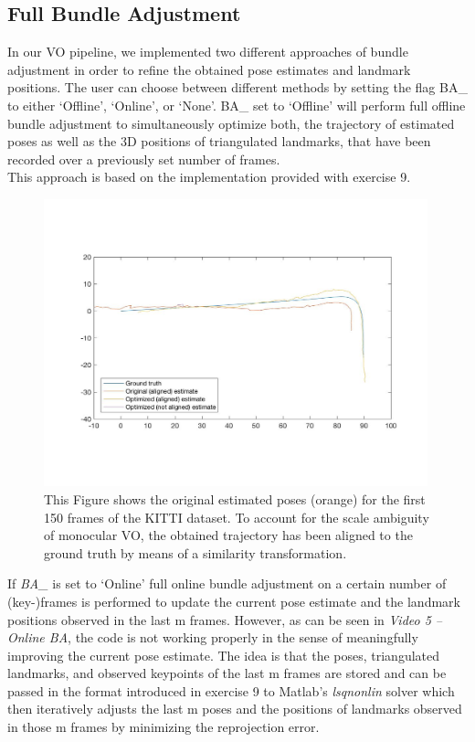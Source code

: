 \subsection{Full Bundle Adjustment}

In our VO pipeline, we implemented two different approaches of bundle adjustment in order to refine the obtained pose estimates and landmark positions. The user can choose between different methods by setting the flag BA\_ to either ‘Offline’, ‘Online’, or ‘None’. 
BA\_ set to ‘Offline’ will perform full offline bundle adjustment to simultaneously optimize both, the trajectory of estimated poses as well as the 3D positions of triangulated landmarks, that have been recorded over a previously set number of frames. \\
This approach is based on the implementation provided with exercise 9. 

\begin{figure}
\includegraphics[width=0.99\textwidth]{files/aligned_optimized.jpg}
\caption[\label{f:aligned_optimized}Offline Bundle Adjustment]{This Figure shows the original estimated poses (orange) for the first 150 frames of the KITTI dataset. To account for the scale ambiguity of monocular VO, the obtained trajectory has been aligned to the ground truth by means of a similarity transformation.}
\end{figure}

If \textit{BA\_} is set to ‘Online’ full online bundle adjustment on a certain number of (key-)frames is performed to update the current pose estimate and the landmark positions observed in the last m frames. However, as can be seen in \textit{Video 5 – Online BA}, the code is not working properly in the sense of meaningfully improving the current pose estimate. The idea is that the poses, triangulated landmarks, and observed keypoints of the last m frames are stored and can be passed in the format introduced in exercise 9 to Matlab’s \textit{lsqnonlin} solver which then iteratively adjusts the last m poses and the positions of landmarks observed in those m frames by minimizing the reprojection error.  



